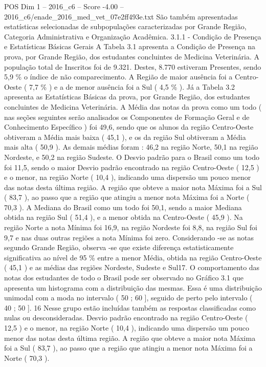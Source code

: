 \begin{textsample}{POS Dim 1 – 2016\_c6 – Score -4.00 – 2016\_c6/enade\_2016\_med\_vet\_07e2ff493e.txt}
São também apresentadas estatísticas selecionadas de subpopulações caracterizadas por Grande Região, Categoria Administrativa e Organização Acadêmica. 3.1.1 - Condição de Presença e Estatísticas Básicas Gerais A Tabela 3.1 apresenta a Condição de Presença na prova, por Grande Região, dos estudantes concluintes de Medicina Veterinária.
A população total de Inscritos foi de 9.321.
Destes, 8.770 estiveram Presentes, sendo 5,9 \% o índice de não comparecimento.
A Região de maior ausência foi a Centro-Oeste ( 7,7 \% ) e a de menor ausência foi a Sul ( 4,5 \% ).
Já a Tabela 3.2 apresenta as Estatísticas Básicas da prova, por Grande Região, dos estudantes concluintes de Medicina Veterinária.
A Média das notas da prova como um todo ( nas seções seguintes serão analisados os Componentes de Formação Geral e de Conhecimento Específico ) foi 49,6, sendo que os alunos da região Centro-Oeste obtiveram a Média mais baixa ( 45,1 ), e os da região Sul obtiveram a Média mais alta ( 50,9 ).
As demais médias foram : 46,2 na região Norte, 50,1 na região Nordeste, e 50,2 na região Sudeste.
O Desvio padrão para o Brasil como um todo foi 11,5, sendo o maior Desvio padrão encontrado na região Centro-Oeste ( 12,5 ) e o menor, na região Norte ( 10,4 ), indicando uma dispersão um pouco menor das notas desta última região.
A região que obteve a maior nota Máxima foi a Sul ( 83,7 ), ao passo que a região que atingiu a menor nota Máxima foi a Norte ( 70,3 ).
A Mediana do Brasil como um todo foi 50,1, sendo a maior Mediana obtida na região Sul ( 51,4 ), e a menor obtida na Centro-Oeste ( 45,9 ).
Na região Norte a nota Mínima foi 16,9, na região Nordeste foi 8,8, na região Sul foi 9,7 e nas duas outras regiões a nota Mínima foi zero.
Considerando -se as notas segundo Grande Região, observa -se que existe diferença estatisticamente significativa ao nível de 95 \% entre a menor Média, obtida na região Centro-Oeste ( 45,1 ) e as médias das regiões Nordeste, Sudeste e Sul17.
O comportamento das notas dos estudantes de todo o Brasil pode ser observado no Gráfico 3.1 que apresenta um histograma com a distribuição das mesmas.
Essa é uma distribuição unimodal com a moda no intervalo ( 50 ; 60 ], seguido de perto pelo intervalo ( 40 ; 50 ]. 16 Nesse grupo estão incluídas também as respostas classificadas como nulas ou desconsideradas.
Desvio padrão encontrado na região Centro-Oeste ( 12,5 ) e o menor, na região Norte ( 10,4 ), indicando uma dispersão um pouco menor das notas desta última região.
A região que obteve a maior nota Máxima foi a Sul ( 83,7 ), ao passo que a região que atingiu a menor nota Máxima foi a Norte ( 70,3 ).

\end{textsample}
